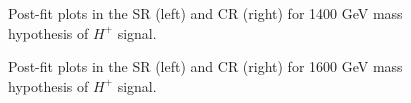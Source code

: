 \begin{figure}[H]
  \centering
  \caption{Post-fit plots in the SR (left) and CR (right) for 1400 GeV mass hypothesis of $H^{+}$ signal.}
  \label{fig:Postfit_Hp1000_Asimov}
\end{figure}
\begin{figure}[H]
  \centering
  \caption{Post-fit plots in the SR (left) and CR (right) for 1600 GeV mass hypothesis of $H^{+}$ signal.}
  \label{fig:Postfit_Hp1000_Asimov}
\end{figure}
